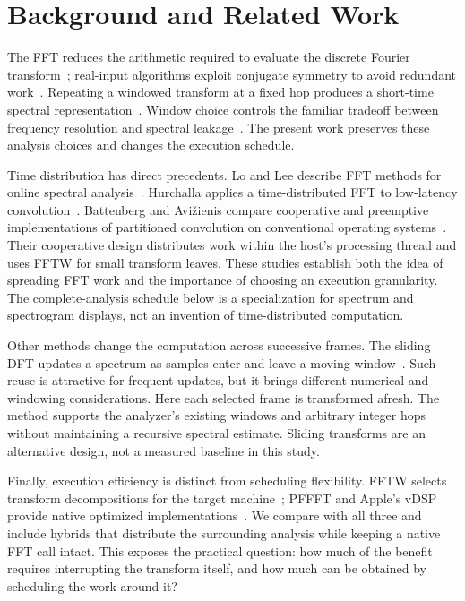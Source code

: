 \section{Background and Related Work}
The FFT reduces the arithmetic required to evaluate the discrete Fourier
transform~\cite{cooley1965}; real-input algorithms exploit conjugate symmetry
to avoid redundant work~\cite{sorensen1987}. Repeating a windowed transform
at a fixed hop produces a short-time spectral representation~\cite{allen1977}.
Window choice controls the familiar tradeoff between frequency resolution and
spectral leakage~\cite{harris1978}. The present work preserves these analysis
choices and changes the execution schedule.

Time distribution has direct precedents. Lo and Lee describe FFT methods for
online spectral analysis~\cite{lo1999}. Hurchalla applies a time-distributed
FFT to low-latency convolution~\cite{hurchalla2010}. Battenberg and
Avi\v{z}ienis compare cooperative and preemptive implementations of partitioned
convolution on conventional operating systems~\cite{battenberg2011}. Their
cooperative design distributes work within the host's processing thread and
uses FFTW for small transform leaves. These studies establish both the idea
of spreading FFT work and the importance of choosing an execution granularity.
The complete-analysis schedule below is a specialization for spectrum and
spectrogram displays, not an invention of time-distributed computation.

Other methods change the computation across successive frames. The sliding
DFT updates a spectrum as samples enter and leave a moving window~\cite{jacobsen2003}.
Such reuse is attractive for frequent updates, but it brings different
numerical and windowing considerations. Here each selected frame is
transformed afresh. The method supports the analyzer's existing windows and
arbitrary integer hops without maintaining a recursive spectral estimate.
Sliding transforms are an alternative design, not a measured baseline in this
study.

Finally, execution efficiency is distinct from scheduling flexibility. FFTW
selects transform decompositions for the target machine~\cite{frigo2005};
PFFFT and Apple's vDSP provide native optimized
implementations~\cite{pffft,vdsp}. We compare with all three and include
hybrids that distribute the surrounding analysis while keeping a native FFT
call intact. This exposes the practical question: how much of the benefit
requires interrupting the transform itself, and how much can be obtained by
scheduling the work around it?
